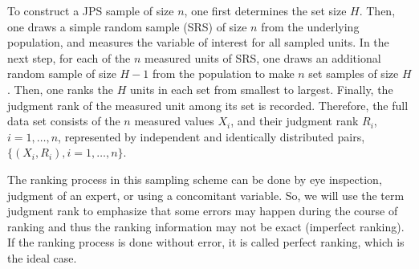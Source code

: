 \documentclass[twoside]{article}
\begin{document}

To construct a JPS sample of size $n$, one first determines the set size $H$. Then, one draws a simple random sample (SRS) of size $n$ from the underlying population, and  measures the variable of interest for all sampled units. In the next step, for each of the $n$ measured units of SRS, one draws an additional random sample of size $H-1$ from the population to make $n$ set samples of size $H$. Then, one ranks the $H$ units in each set from smallest to largest. Finally, the  judgment rank of the measured unit among its set is recorded.  
Therefore, the full data set consists of  the $n$ measured values $X_i$, and their judgment rank $R_i$, $i=1,\ldots,n$, represented by independent and identically distributed pairs, $\{(X_i, R_i), i = 1, \ldots, n\}$.

The ranking process in this sampling scheme can be done by eye inspection, judgment of an expert, or using a concomitant variable. So, we will use the term  judgment rank to emphasize that some errors may happen during the course of ranking and thus the ranking information may not be exact  (imperfect ranking). If the ranking process is done without error, it is called perfect ranking, which is the ideal case. 
\end{document}
